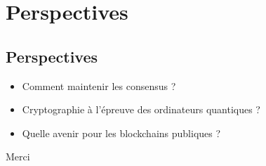 \documentclass[presentation]{beamer}
\begin{document}
\section{Perspectives}
\label{sec:orge2c7ef8}
\subsection{Perspectives}
\label{sec:org07aad0e}
\begin{frame}[label={sec:org1b99a6d}]{}
\begin{itemize}
\item Comment maintenir les consensus ?
\item Cryptographie à l'épreuve des ordinateurs quantiques ?
\item Quelle avenir pour les blockchains publiques ?
\end{itemize}
\end{frame}
\begin{frame}[label={sec:org6827cf2}]{}
\begin{block}{Merci}
\end{block}
\end{frame}
\end{document}
